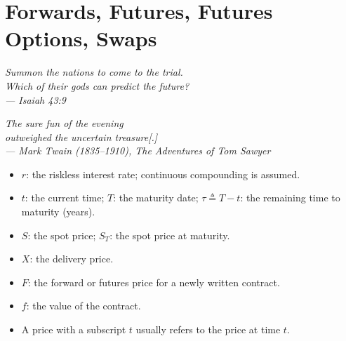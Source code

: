 \providecommand*{\zh}[1]{\par\smallskip{\small\color{MidnightBlue!80!black}\noindent【中】#1\par}\smallskip}

\chapter{Forwards, Futures, Futures Options, Swaps}
\label{ch:forwards}


\begin{flushright}
	\itshape Summon the nations to come to the trial.\\
	Which of their gods can predict the future?\\
	\upshape --- Isaiah 43:9
\end{flushright}

\begin{flushright}
	\itshape The sure fun of the evening\\
	outweighed the uncertain treasure[.]\\
	\upshape --- Mark Twain (1835--1910), \itshape The Adventures of Tom Sawyer
\end{flushright}

\bigskip


\begin{notation}
	\begin{itemize}[nosep]
		\item $r$: the riskless interest rate; continuous compounding is assumed.
		\item $t$: the current time; $T$: the maturity date; $\tau\triangleq T-t$: the remaining time to maturity (years).
		\item $S$: the spot price; $S_{T}$: the spot price at maturity.
		\item $X$: the delivery price.
		\item $F$: the forward or futures price for a newly written contract.
		\item $f$: the value of the contract.
		\item A price with a subscript $t$ usually refers to the price at time $t$.
	\end{itemize}
\end{notation}

